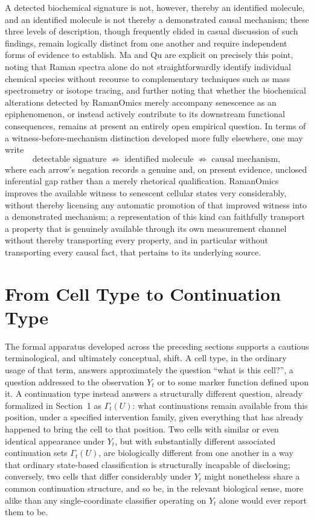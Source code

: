 \documentclass[11pt]{article}
\begin{document}
A detected biochemical signature is not, however, thereby an identified molecule, and an identified molecule is not thereby a demonstrated causal mechanism; these three levels of description, though frequently elided in casual discussion of such findings, remain logically distinct from one another and require independent forms of evidence to establish. Ma and Qu are explicit on precisely this point, noting that Raman spectra alone do not straightforwardly identify individual chemical species without recourse to complementary techniques such as mass spectrometry or isotope tracing, and further noting that whether the biochemical alterations detected by RamanOmics merely accompany senescence as an epiphenomenon, or instead actively contribute to its downstream functional consequences, remains at present an entirely open empirical question. In terms of a witness-before-mechanism distinction developed more fully elsewhere, one may write
\begin{equation}
\text{detectable signature} \;\not\Longrightarrow\; \text{identified molecule} \;\not\Longrightarrow\; \text{causal mechanism},
\end{equation}
where each arrow's negation records a genuine and, on present evidence, unclosed inferential gap rather than a merely rhetorical qualification. RamanOmics improves the available witness to senescent cellular states very considerably, without thereby licensing any automatic promotion of that improved witness into a demonstrated mechanism; a representation of this kind can faithfully transport a property that is genuinely available through its own measurement channel without thereby transporting every property, and in particular without transporting every causal fact, that pertains to its underlying source.

\section{From Cell Type to Continuation Type}

The formal apparatus developed across the preceding sections supports a cautious terminological, and ultimately conceptual, shift. A cell type, in the ordinary usage of that term, answers approximately the question ``what is this cell?'', a question addressed to the observation $Y_t$ or to some marker function defined upon it. A continuation type instead answers a structurally different question, already formalized in Section~1 as $\Gamma_t(U)$: what continuations remain available from this position, under a specified intervention family, given everything that has already happened to bring the cell to that position. Two cells with similar or even identical appearance under $Y_t$, but with substantially different associated continuation sets $\Gamma_t(U)$, are biologically different from one another in a way that ordinary state-based classification is structurally incapable of disclosing; conversely, two cells that differ considerably under $Y_t$ might nonetheless share a common continuation structure, and so be, in the relevant biological sense, more alike than any single-coordinate classifier operating on $Y_t$ alone would ever report them to be.
\end{document}
